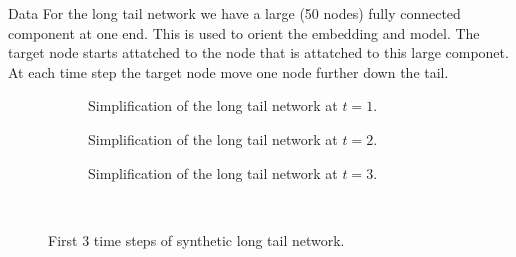 \documentclass{article}
\begin{document}
\begin{section}{Data}
    For the long tail network we have a large (50 nodes) fully connected component at one end. This is used to orient the embedding and model. The target node starts attatched to the node that is attatched to this large componet. At each time step the target node move one node further down the tail.
    \begin{figure}[H]
        \centering
        \begin{subfigure}[c]{0.3\textwidth}
            \centering
            \resizebox{.6\width}{!}{}
            \caption{Simplification of the long tail network at $t=1$.}
        \end{subfigure}
        \hfill
        \centering
        \begin{subfigure}[c]{0.3\textwidth}
            \centering
            \resizebox{.6\width}{!}{}
            \caption{Simplification of the long tail network at $t=2$.}
        \end{subfigure}
        \hfill
        \centering
        \begin{subfigure}[c]{0.3\textwidth}
            \centering
            \resizebox{.6\width}{!}{}
            \caption{Simplification of the long tail network at $t=3$.}
        \end{subfigure}\\
        \caption{First 3 time steps of synthetic long tail network.}
    \end{figure}    



\end{section}
\end{document}
